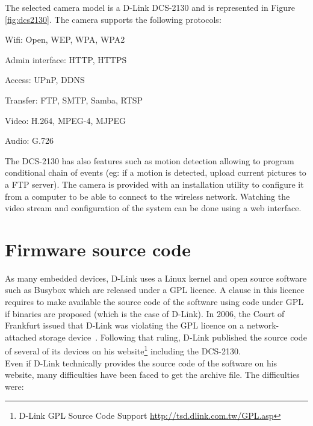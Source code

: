 The selected camera model is a D-Link DCS-2130 and is represented in Figure \ref{fig:dcs2130}. The camera supports the following protocols:\\

\begin{itemizealt}
\item Wifi: Open, WEP, WPA, WPA2
\item Admin interface: HTTP, HTTPS
\item Access: UPnP, DDNS
\item Transfer: FTP, SMTP, Samba, RTSP
\item Video: H.264, MPEG-4, MJPEG
\item Audio: G.726
\end{itemizealt}

The DCS-2130 has also features such as motion detection allowing to program conditional chain of events (eg: if a motion is detected, upload current pictures to a FTP server).
The camera is provided with an installation utility to configure it from a computer to be able to connect to the wireless network.
Watching the video stream and configuration of the system can be done using a web interface.

\section{Firmware source code}
\label{sec:dcs-gpl}

As many embedded devices, D-Link uses a Linux kernel and open source software such as Busybox which are released under a GPL licence.
A clause in this licence requires to make available the source code of the software using code under GPL if binaries are proposed (which is the case of D-Link).
In 2006, the Court of Frankfurt issued that D-Link was violating the GPL licence on a network-attached storage device~\cite{dlink-gpl-viol}.
Following that ruling, D-Link published the source code of several of its devices on his website\footnote{D-Link GPL Source Code Support \url{http://tsd.dlink.com.tw/GPL.asp}} including the DCS-2130.\\

Even if D-Link technically provides the source code of the software on his website, many difficulties have been faced to get the archive file.
The difficulties were:

